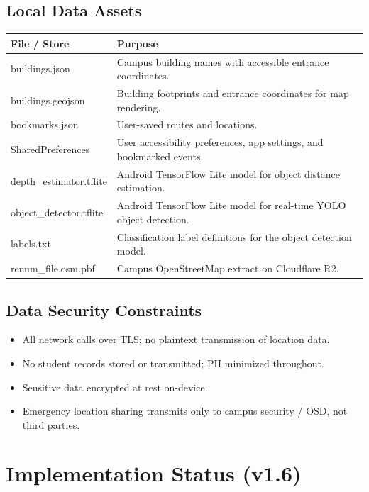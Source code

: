 \documentclass[12pt]{article}
\begin{document}
\subsection{Local Data Assets}
\begin{tabularx}{\textwidth}{|l|X|}
\hline
\textbf{File / Store} & \textbf{Purpose} \\
\hline
buildings.json & Campus building names with accessible entrance coordinates. \\
\hline
buildings.geojson & Building footprints and entrance coordinates for map rendering. \\
\hline
bookmarks.json & User-saved routes and locations. \\
\hline
SharedPreferences & User accessibility preferences, app settings, and bookmarked events. \\
\hline
depth\_estimator.tflite & Android TensorFlow Lite model for object distance estimation. \\
\hline
object\_detector.tflite & Android TensorFlow Lite model for real-time YOLO object detection. \\
\hline
labels.txt & Classification label definitions for the object detection model. \\
\hline
renum\_file.osm.pbf & Campus OpenStreetMap extract on Cloudflare R2. \\
\hline
\end{tabularx}

\subsection{Data Security Constraints}
\begin{itemize}
    \item All network calls over TLS; no plaintext transmission of location data.
    \item No student records stored or transmitted; PII minimized throughout.
    \item Sensitive data encrypted at rest on-device.
    \item Emergency location sharing transmits only to campus security / OSD, not third parties.
\end{itemize}

\section{Implementation Status (v1.6)}
\end{document}
